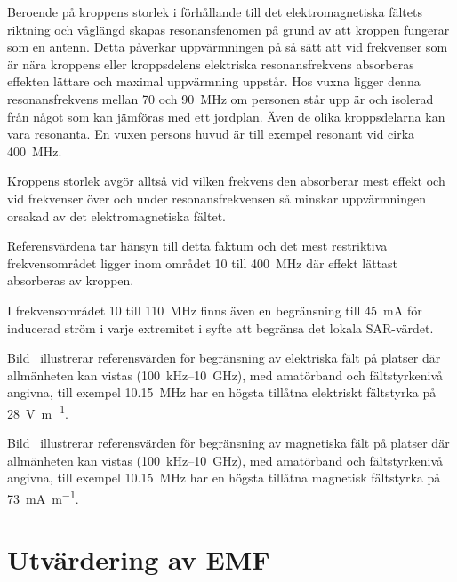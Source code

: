 Beroende på kroppens storlek i förhållande till det elektromagnetiska fältets
riktning och våglängd skapas resonansfenomen på grund av att kroppen fungerar
som en antenn.
Detta påverkar uppvärmningen på så sätt att vid frekvenser som är nära kroppens
eller kroppsdelens elektriska resonansfrekvens absorberas effekten lättare och
maximal uppvärmning uppstår.
Hos vuxna ligger denna resonansfrekvens mellan 70 och \qty{90}{\mega\hertz} om
personen står upp är och isolerad från något som kan jämföras med ett jordplan.
Även de olika kroppsdelarna kan vara resonanta.
En vuxen persons huvud är till exempel resonant vid cirka \qty{400}{\mega\hertz}.

Kroppens storlek avgör alltså vid vilken frekvens den absorberar mest effekt och
vid frekvenser över och under resonansfrekvensen så minskar uppvärmningen
orsakad av det elektromagnetiska fältet.

Referensvärdena tar hänsyn till detta faktum och det mest restriktiva
frekvensområdet ligger inom området 10 till \qty{400}{\mega\hertz} där effekt
lättast absorberas av kroppen.

I frekvensområdet 10 till \qty{110}{\mega\hertz} finns även en begränsning till
\qty{45}{\milli\ampere} för inducerad ström i varje extremitet i syfte att
begränsa det lokala SAR-värdet.

\newpage
{}

Bild~ illustrerar referensvärden för begränsning av elektriska
fält på platser där allmänheten kan vistas (100~kHz--10~GHz), med amatörband
och fältstyrkenivå angivna, till exempel \qty{10,15}{\mega\hertz} har en högsta
tillåtna elektriskt fältstyrka på \qty{28}{\volt\per\metre}.

\newpage
Bild~ illustrerar referensvärden för begränsning av magnetiska
fält på platser där allmänheten kan vistas (100~kHz--10~GHz), med amatörband
och fältstyrkenivå angivna, till exempel \qty{10,15}{\mega\hertz} har en högsta
tillåtna magnetisk fältstyrka på \qty{73}{\milli\ampere\per\metre}.

\clearpage
\section{Utvärdering av EMF}

